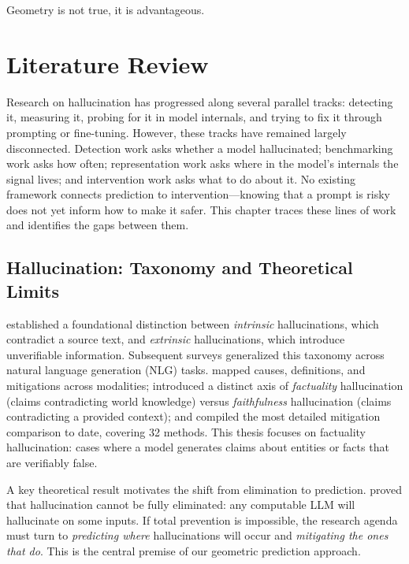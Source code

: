 \begin{savequote}[75mm]
Geometry is not true, it is advantageous.
\end{savequote}

\chapter{Literature Review}
\label{ch:litreview}

Research on hallucination has progressed along several parallel tracks: detecting it, measuring it, probing for it in model internals, and trying to fix it through prompting or fine-tuning. However, these tracks have remained largely disconnected. Detection work asks whether a model hallucinated; benchmarking work asks how often; representation work asks where in the model's internals the signal lives; and intervention work asks what to do about it. No existing framework connects prediction to intervention---knowing that a prompt is risky does not yet inform how to make it safer. This chapter traces these lines of work and identifies the gaps between them.


\section{Hallucination: Taxonomy and Theoretical Limits}
\label{sec:lit-taxonomy}

\citet{maynez2020faithfulness} established a foundational distinction between \emph{intrinsic} hallucinations, which contradict a source text, and \emph{extrinsic} hallucinations, which introduce unverifiable information.  Subsequent surveys generalized this taxonomy across natural language generation (NLG) tasks.  \citet{ji2023survey} mapped causes, definitions, and mitigations across modalities; \citet{huang2023survey} introduced a distinct axis of \emph{factuality} hallucination (claims contradicting world knowledge) versus \emph{faithfulness} hallucination (claims contradicting a provided context); and \citet{tonmoy2024comprehensive} compiled the most detailed mitigation comparison to date, covering 32 methods.  This thesis focuses on factuality hallucination: cases where a model generates claims about entities or facts that are verifiably false.

A key theoretical result motivates the shift from elimination to prediction.  \citet{xu2024hallucination} proved that hallucination cannot be fully eliminated: any computable LLM will hallucinate on some inputs.  If total prevention is impossible, the research agenda must turn to \emph{predicting where} hallucinations will occur and \emph{mitigating the ones that do}.  This is the central premise of our geometric prediction approach.

